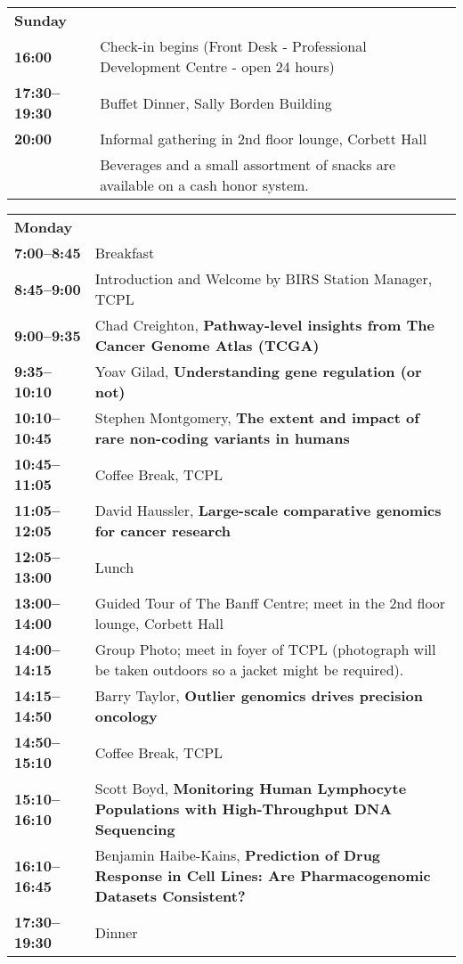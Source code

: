 \documentclass[11pt]{article}
\begin{document}
\begin{tabular}{ p{1in} p{5.8in} } 

{\bf\large Sunday} & \\

{\bf 16:00} & Check-in begins (Front Desk - Professional Development Centre -  open 24 hours)\\
{\bf 17:30--19:30} & Buffet Dinner, Sally Borden Building\\
{\bf 20:00} & Informal gathering in 2nd floor lounge, Corbett Hall\\
            &Beverages and a small assortment of snacks are available on a cash honor system.\\
\end{tabular}

\begin{tabular}{ p{1in} p{5.8in} } 
{\bf\large Monday} & \\

{\bf 7:00--8:45}  & Breakfast\\
{\bf 8:45--9:00}  & Introduction and Welcome by BIRS Station Manager, TCPL\\
{\bf 9:00--9:35}  & Chad Creighton, {\bf Pathway-level insights from The Cancer Genome Atlas (TCGA)}\\
{\bf 9:35--10:10}  & Yoav Gilad, {\bf Understanding gene regulation (or not)}\\
{\bf 10:10--10:45}  & Stephen Montgomery, {\bf The extent and impact of rare non-coding variants in humans}\\
{\bf 10:45--11:05} & Coffee Break, TCPL\\
{\bf 11:05--12:05}  & David Haussler, {\bf Large-scale comparative genomics for cancer research}\\
{\bf 12:05--13:00} & Lunch\\
{\bf 13:00--14:00} & Guided Tour of The Banff Centre; meet in the 2nd floor lounge, Corbett Hall\\
{\bf 14:00--14:15} & Group Photo; meet in foyer of TCPL (photograph will be taken outdoors so a jacket might be required). \\
{\bf 14:15--14:50}  & Barry Taylor, {\bf Outlier genomics drives precision oncology }\\
{\bf 14:50--15:10} & Coffee Break, TCPL\\
{\bf 15:10--16:10}  & Scott Boyd, {\bf Monitoring Human Lymphocyte Populations with High-Throughput DNA Sequencing}\\
{\bf 16:10--16:45}  &  Benjamin Haibe-Kains, {\bf Prediction of Drug Response in Cell Lines: Are Pharmacogenomic Datasets Consistent?}\\
{\bf 17:30--19:30} & Dinner\\
\end{tabular}
\end{document}
